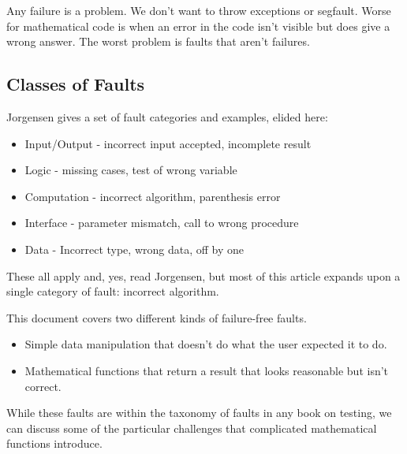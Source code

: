 \documentclass[fleqn,10pt]{olplainarticle}
\begin{document}
Any failure is a problem. We don't want to throw exceptions or segfault.
Worse for mathematical code is when an error in the code isn't visible
but does give a wrong answer.
The worst problem is faults that aren't failures.


\subsection{Classes of Faults}
Jorgensen gives a set of fault categories and examples, elided here:
\begin{itemize}
    \item Input/Output - incorrect input accepted, incomplete result
    \item Logic - missing cases, test of wrong variable
    \item Computation - incorrect algorithm, parenthesis error
    \item Interface - parameter mismatch, call to wrong procedure
    \item Data - Incorrect type, wrong data, off by one
\end{itemize}
These all apply and, yes, read Jorgensen, but most of this article 
expands upon a single category of fault: incorrect algorithm.

This document covers two different kinds of failure-free faults.
\begin{itemize}
\item Simple data manipulation that doesn't do what the user
   expected it to do.
   
\item Mathematical functions that return a result that looks
   reasonable but isn't correct.
\end{itemize}
While these faults are within the taxonomy of faults
in any book on testing, we can discuss some of the particular
challenges that complicated mathematical functions introduce.


\end{document}
